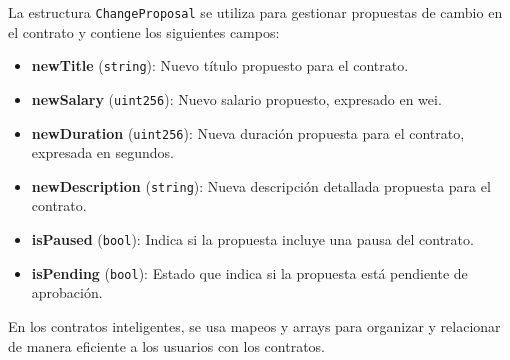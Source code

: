 La estructura \texttt{ChangeProposal} se utiliza para gestionar propuestas de cambio en el contrato y contiene los siguientes campos:
\begin{itemize}
    \item \textbf{newTitle} (\texttt{string}): Nuevo título propuesto para
     el contrato.
    \item \textbf{newSalary} (\texttt{uint256}): Nuevo salario propuesto,
     expresado en wei.
    \item \textbf{newDuration} (\texttt{uint256}): Nueva duración propuesta
     para el contrato, expresada en segundos.
    \item \textbf{newDescription} (\texttt{string}): Nueva descripción
     detallada propuesta para el contrato.
    \item \textbf{isPaused} (\texttt{bool}): Indica si la propuesta incluye
     una pausa del contrato.
    \item \textbf{isPending} (\texttt{bool}): Estado que indica si la
     propuesta está pendiente de aprobación.
\end{itemize}

En los contratos inteligentes, se usa mapeos y arrays para organizar y relacionar de manera eficiente a los usuarios con los contratos.

